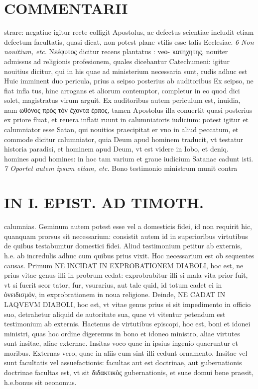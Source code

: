 \documentclass{article}
\begin{document}
\begin{pages}
\section*{COMMENTARII }
\marginpar{[ p.68 ]}\pstart strare: negatiue igitur recte colligit Apostolus, ac defectus scientiae includit etiam defectum facultatis, quasi dicat, non potest plane vtilis esse talis Eeclesiae.  \pend
\textit{6 Non nouitium, etc. }\pstart Νεέφυτος dicitur recens plantatus : veο- κατηχητης, nouiter admissus ad religionis profesionem, quales dicebantur Catechumeni: igitur nouitius dicitur, qui in his quae ad ministerium necessaria sunt, rudis adhuc est Huic imminent duo pericula, prius a seipso posterius ab auditoribus  Ex seipso, ne fiat infla tus, hinc arrogans et aliorum contemptor, completur in eo quod dici solet, magistratus virum arguit. Ex auditoribus autem periculum est, inuidia, nam ωθόνος πρὸς τόν ἔχοντα έρπος, tamen Apostolus illa conuertit quasi posterius ex priore fluat, et reuera inflati ruunt in calumniatoris iudicium: potest igitur et calumniator esse Satan, qui nouitios praecipitat er vno in aliud peccatum, et commode dicitur calumniator, quia Deum apud hominem traducit, vt testatur historia paradisi, et hominem apud Deum, vt est videre in Iobo, et deniq. homines apud homines: in hoc tam varium et graue iudicium Satanae cadunt isti.  \pend
\textit{7 Oportet autem ipsum etiam, etc. }\pstart Bono testimonio ministrum munit contra  \pend
\section*{IN I. EPIST. AD TIMOTH. }
\marginpar{[ p.69 ]}\pstart calumnias. Geminum autem potest esse vel a domesticis fidei, id non requirit hic, quanquam prorsus sit necessarium: consistit autem id in superioribus  virtutibus  de quibus  testabumtur domestici fidei. Aliud testimonium petitur ab externis, h.e. ab incredulis adhuc cum quibus  prius vixit. Hoc necessarium est ob sequentes causas. Primum NE INCIDAT IN EXPROBATIONEM DIABOLI, hoc est, ne prius vitae genus illi in probrum cedat: exprobrabitur illi si mala vita prior fuit, vt si fuerit scor tator, fur, vsurarius, aut tale quid, id totum cadet ei in ὀνειδισμόν, in exprobrationem in noua religione. Deinde, NE CADAT IN LAQVEVM DIABOLI, hoc est, vt vitae genus prius ei sit impedimento in officio suo, detrahetur aliquid de autoritate sua, quae vt vitentur petendum est testimonium ab externis. Hactenus de virtutibus episcopi, hoc est, boni et idonei ministri, quas hoc ordine digeremus in bono et idoneo ministro, aliae virtutes sunt insitae, aliae externae. Insitas voco quae in ipsius ingenio quaeruntur et moribus. Externas vero, quae in aliis cum sint illi cedunt ornamento. Insitae vel sunt facultatis vel assuefactionis: facultas aut est doctrinae, aut gubernationis doctrinae facultas est, vt sit διδακτικὸς gubernationis, et suae domui bene praesit, h.e.bonus sit oeonomus.  \pend

\end{pages}
\end{document}
